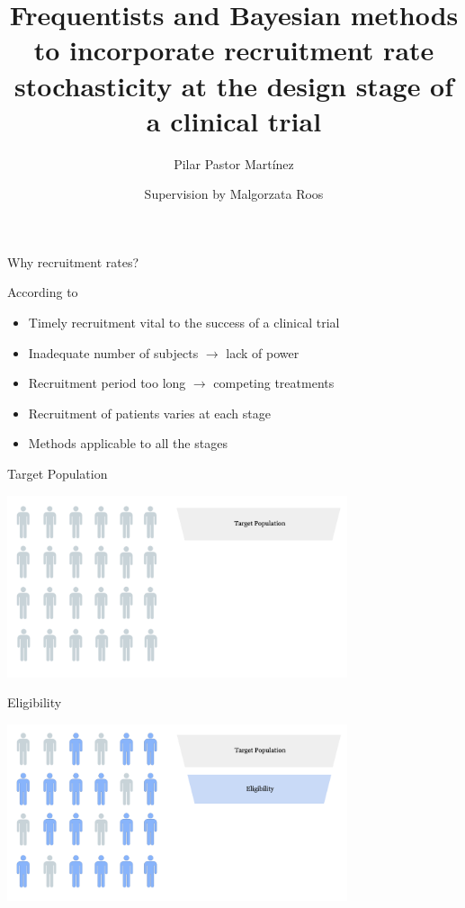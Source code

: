 \documentclass[english]{beamer}\usepackage[]{graphicx}\usepackage[]{xcolor}
\title[Recruitment rate stochasticity
at the design stage of a clinical trial]{Frequentists and Bayesian methods to incorporate
recruitment rate stochasticity
at the design stage of a clinical trial}
\author{Supervision by Malgorzata Roos}
\subtitle{Pilar Pastor Martínez}
\begin{document}
\maketitle


\begin{frame}{Why recruitment rates?}

According to \cite{carter2004application}
\begin{itemize}
\item Timely recruitment vital to the success of a clinical trial
\item Inadequate number of subjects $\rightarrow$ lack of power
\item Recruitment period too long $\rightarrow$ competing treatments
\item Recruitment of patients varies at each stage 
\item Methods applicable to all the stages
\end{itemize}


\end{frame}


\begin{frame}{Target Population}

\includegraphics[width=100mm,scale=1]{targetpop.png}

\end{frame}

\begin{frame}{Eligibility}

\includegraphics[width=100mm,scale=1]{eligibility.png}

\end{frame}
\end{document}

